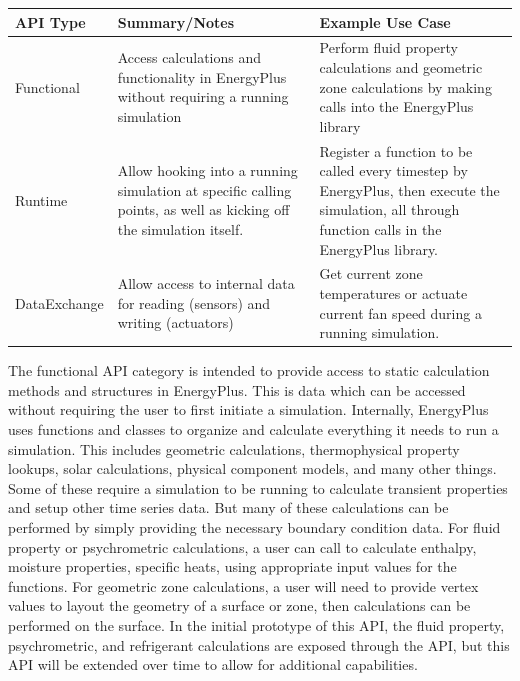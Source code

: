 \documentclass[5p, authoryear]{elsarticle}
\begin{document}
\begin{table}
\begin{center}
\begin{tabular}{@{}p{1.25in}p{2.5in}p{2.5in}@{}}
\toprule
API Type     & Summary/Notes & Example Use Case                                                                                                                                  \\ 
\midrule
Functional   & Access calculations and functionality in EnergyPlus without requiring a running simulation & Perform fluid property calculations and geometric zone calculations by making calls into the EnergyPlus library \\
Runtime      & Allow hooking into a running simulation at specific calling points, as well as kicking off the simulation itself. & Register a function to be called every timestep by EnergyPlus, then execute the simulation, all through function calls in the EnergyPlus library. \\
DataExchange & Allow access to internal data for reading (sensors) and writing (actuators) & Get current zone temperatures or actuate current fan speed during a running simulation.                                                           \\ 
\bottomrule
\end{tabular}
\label{table:api:uses:classes}
\end{center}
\end{table}

The functional API category is intended to provide access to static calculation methods and structures in EnergyPlus.  This is data which can be accessed without requiring the user to first initiate a simulation.  Internally, EnergyPlus uses functions and classes to organize and calculate everything it needs to run a simulation.  This includes geometric calculations, thermophysical property lookups, solar calculations, physical component models, and many other things.  Some of these require a simulation to be running to calculate transient properties and setup other time series data.  But many of these calculations can be performed by simply providing the necessary boundary condition data.  For fluid property or psychrometric calculations, a user can call to calculate enthalpy, moisture properties, specific heats, using appropriate input values for the functions.  For geometric zone calculations, a user will need to provide vertex values to layout the geometry of a surface or zone, then calculations can be performed on the surface.  In the initial prototype of this API, the fluid property, psychrometric, and refrigerant calculations are exposed through the API, but this API will be extended over time to allow for additional capabilities.
\end{document}
